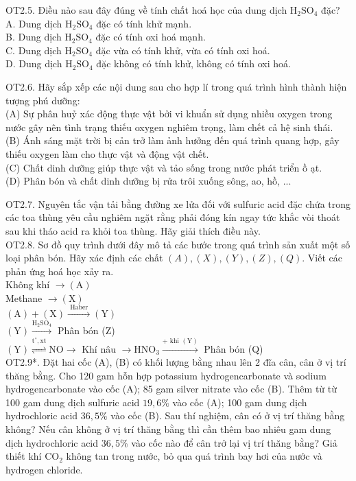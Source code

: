 \documentclass[10pt]{article}
\begin{document}
OT2.5. Điều nào sau đây đúng về tính chất hoá học của dung dịch $\mathrm{H}_{2} \mathrm{SO}_{4}$ đặc?\\
A. Dung dịch $\mathrm{H}_{2} \mathrm{SO}_{4}$ đặc có tính khử mạnh.\\
B. Dung dịch $\mathrm{H}_{2} \mathrm{SO}_{4}$ đặc có tính oxi hoá mạnh.\\
C. Dung dịch $\mathrm{H}_{2} \mathrm{SO}_{4}$ đặc vừa có tính khử, vừa có tính oxi hoá.\\
D. Dung dịch $\mathrm{H}_{2} \mathrm{SO}_{4}$ đặc không có tính khử, không có tính oxi hoá.

OT2.6. Hãy sắp xếp các nội dung sau cho hợp lí trong quá trình hình thành hiện tượng phú dưỡng:\\
(A) Sự phân huỷ xác động thực vật bởi vi khuẩn sử dụng nhiều oxygen trong nước gây nên tình trạng thiếu oxygen nghiêm trọng, làm chết cả hệ sinh thái.\\
(B) Ánh sáng mặt trời bị cản trở làm ảnh hưởng đến quá trình quang hợp, gây thiếu oxygen làm cho thực vật và động vật chết.\\
(C) Chất dinh dưỡng giúp thực vật và tảo sống trong nước phát triển ồ ạt.\\
(D) Phân bón và chất dinh dưỡng bị rửa trôi xuống sông, ao, hồ, ...

OT2.7. Nguyên tắc vận tải bằng đường xe lửa đối với sulfuric acid đặc chứa trong các toa thùng yêu cầu nghiêm ngặt rằng phải đóng kín ngay tức khắc vòi thoát sau khi tháo acid ra khỏi toa thùng. Hãy giải thích điều này.\\
OT2.8. Sơ đồ quy trình dưới đây mô tả các bước trong quá trình sản xuất một số loại phân bón. Hãy xác định các chất $(A),(X),(Y),(Z),(Q)$. Viết các phản ứng hoá học xảy ra.\\
Không khí $\rightarrow(\mathrm{A})$\\
Methane $\rightarrow(\mathrm{X})$\\
$(\mathrm{A})+(\mathrm{X}) \xrightarrow{\text { Haber }}(\mathrm{Y})$\\
$(\mathrm{Y}) \xrightarrow{\mathrm{H}_{2} \mathrm{SO}_{4}}$ Phân bón (Z)\\
$(\mathrm{Y}) \stackrel{\mathrm{t}^{\circ}, \mathrm{xt}}{\rightleftharpoons} \mathrm{NO} \rightarrow$ Khí nâu $\rightarrow \mathrm{HNO}_{3} \xrightarrow{+ \text { khi }(\mathrm{Y})}$ Phân bón (Q)\\
OT2.9*. Đặt hai cốc (A), (B) có khối lượng bằng nhau lên 2 đĩa cân, cân ở vị trí thăng bằng. Cho 120 gam hỗn hợp potassium hydrogencarbonate và sodium hydrogencarbonate vào cốc (A); 85 gam silver nitrate vào cốc (B). Thêm từ từ 100 gam dung dịch sulfuric acid $19,6 \%$ vào cốc (A); 100 gam dung dịch hydrochloric acid $36,5 \%$ vào cốc (B). Sau thí nghiệm, cân có ở vị trí thăng bằng không? Nếu cân không ở vị trí thăng bằng thì cần thêm bao nhiêu gam dung dịch hydrochloric acid $36,5 \%$ vào cốc nào để cân trở lại vị trí thăng bằng? Giả thiết khí $\mathrm{CO}_{2}$ không tan trong nước, bỏ qua quá trình bay hơi của nước và hydrogen chloride.
\end{document}
